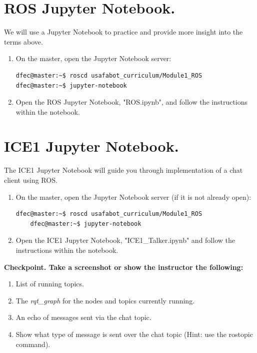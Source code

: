 \documentclass{handout}
\begin{document}
\newpage
\clearpage
\pagebreak

\section{ROS Jupyter Notebook.}
We will use a Jupyter Notebook to practice and provide more insight into the terms above.

\begin{enumerate}
\item On the master, open the Jupyter Notebook server:

\begin{lstlisting}[language=bash]
dfec@master:~$ roscd usafabot_curriculum/Module1_ROS
dfec@master:~$ jupyter-notebook
\end{lstlisting}

\item Open the ROS Jupyter Notebook, "ROS.ipynb", and follow the instructions within the notebook.

\end{enumerate}

\section{ICE1 Jupyter Notebook.}
The ICE1 Jupyter Notebook will guide you through implementation of a chat client using ROS.

\begin{enumerate}\setlength\itemsep{1em}
	\item On the master, open the Jupyter Notebook server (if it is not already open):
\begin{lstlisting}[language=bash]
	dfec@master:~$ roscd usafabot_curriculum/Module1_ROS
	dfec@master:~$ jupyter-notebook
\end{lstlisting}

\item Open the ICE1 Jupyter Notebook, "ICE1\_Talker.ipynb" and follow the instructions within the notebook. 
\end{enumerate}

\textbf{Checkpoint. Take a screenshot or show the instructor the following:}
\begin{enumerate}
	\item List of running topics.
	\item The \textit{rqt\_graph} for the nodes and topics currently running.
	\item An echo of messages sent via the chat topic.
	\item Show what type of message is sent over the chat topic (Hint: use the rostopic command).
\end{enumerate}
\end{document}
